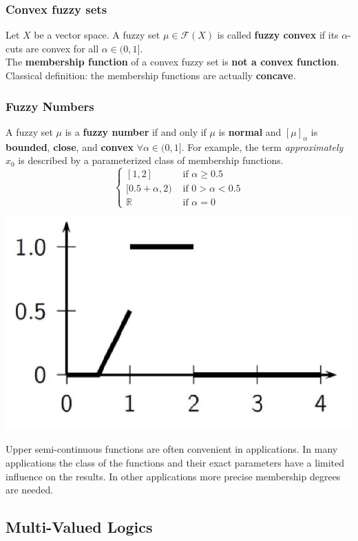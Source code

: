 \newpage

\subsubsection{Convex fuzzy sets}
Let $X$ be a vector space. A fuzzy set $\mu \in \mathcal{F} (X)$ is called \textbf{fuzzy convex} if its $\alpha$-cuts are convex for all $\alpha \in (0,1]$.\\

The \textbf{membership function} of a convex fuzzy set is \textbf{not a convex function}.\\

Classical definition: the membership functions are actually \textbf{concave}.\\

\subsubsection{Fuzzy Numbers}
A fuzzy set $\mu$ is a \textbf{fuzzy number} if and only if $\mu$ is \textbf{normal} and $[\mu]_\alpha$ is \textbf{bounded}, \textbf{close}, and \textbf{convex} $\forall \alpha \in (0, 1]$. For example, the term \textit{approximately} $x_0$ is described by a parameterized class of membership functions.
$$ 
\begin{cases}
	[1, 2] & \text{ if } \alpha \geq 0.5 \\
	[0.5 + \alpha, 2) & \text{ if } 0 > \alpha < 0.5 \\
	\mathbb{R} & \text{ if } \alpha = 0
\end{cases}
$$
\begin{center}
	\includegraphics[width=0.4\columnwidth]{img/FS/numbers1}
\end{center}
Upper semi-continuous functions are often convenient in applications. In many applications the class of the functions and their exact parameters have a limited influence on the results. In other applications more precise membership degrees are needed. \\

\newpage

\subsection{Multi-Valued Logics}

